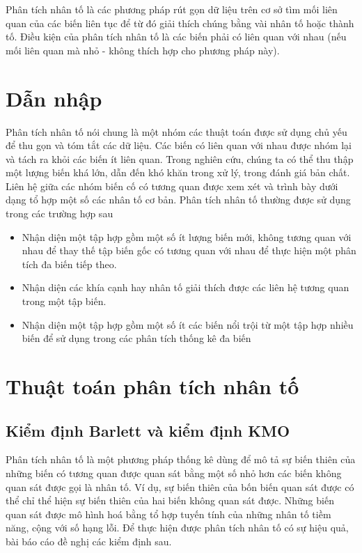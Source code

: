 \documentclass[../thesis.tex]{subfiles}
\begin{document}
Phân tích nhân tố là các phương pháp rút gọn dữ liệu trên cơ sở tìm mối liên quan của các biến liên tục để từ đó giải thích chúng bằng vài nhân tố hoặc thành tố. Điều kiện của phân tích nhân tố là các biến phải có liên quan với nhau (nếu mối liên quan mà nhỏ - không thích hợp cho phương pháp này).
\section{Dẫn nhập}

Phân tích nhân tố nói chung là một nhóm các thuật toán được sử dụng chủ yếu để thu gọn và tóm tắt các dữ liệu. Các biến có liên quan với nhau được nhóm lại và tách ra khỏi các biến ít liên quan. Trong nghiên cứu, chúng ta có thể thu thập một lượng biến khá lớn, dẫn đến khó khăn trong xử lý, trong đánh giá bản chất. Liên hệ giữa các nhóm biến cố có tương quan được xem xét và trình bày dưới dạng tổ hợp một số các nhân tố cơ bản. Phân tích nhân tố thường được sử dụng trong các trường hợp sau

\begin{itemize}
	\item Nhận diện một tập hợp gồm một số ít lượng biến mới, không tương quan với nhau để thay thế tập biến gốc có tương quan với nhau để thực hiện một phân tích đa biến tiếp theo.
	\item Nhận diện các khía cạnh hay nhân tố giải thích được các liên hệ tương quan trong một tập biến. 
	\item Nhận diện một tập hợp gồm một số ít các biến nổi trội từ một tập hợp nhiều biến để sử dụng trong các phân tích thống kê đa biến
\end{itemize}



\section{Thuật toán phân tích nhân tố}
\subsection{Kiểm định Barlett và kiểm định KMO}
Phân tích nhân tố là một phương pháp thống kê dùng để mô tả sự biến thiên của những biến có tương quan được quan sát bằng một số nhỏ hơn các biến không quan sát được gọi là nhân tố. Ví dụ, sự biến thiên của bốn biến quan sát được có thể chỉ thể hiện sự biến thiên của hai biến không quan sát được. Những biến quan sát được mô hình hoá bằng tổ hợp tuyến tính của những nhân tố tiềm năng, cộng với số hạng lỗi. Để thực hiện được phân tích nhân tố có sự hiệu quả, bài báo cáo đề nghị các kiểm định sau.
\end{document}
